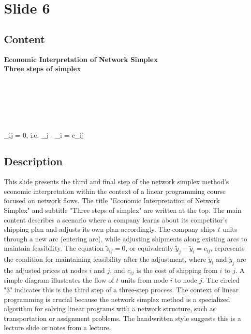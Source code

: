 \documentclass{article}%
\begin{document}
%
\newpage%
\section{Slide 6}%
\label{sec:Slide6}%
\subsection{Content}%

\textbf{Economic Interpretation of Network Simplex} \\
\underline{\textbf{Three steps of simplex}} \\
 \\
 \\
 \\
 \\
 \\
 \\
_{ij} = 0, \quad i.e. \quad {}_j - _i = c_{ij} \\
%
\subsection{Description}%
This slide presents the third and final step of the network simplex method's economic interpretation within the context of a linear programming course focused on network flows. The title "Economic Interpretation of Network Simplex" and subtitle "Three steps of simplex" are written at the top. The main content describes a scenario where a company learns about its competitor's shipping plan and adjusts its own plan accordingly. The company ships $t$ units through a new arc (entering arc), while adjusting shipments along existing arcs to maintain feasibility. The equation $\tilde{z}_{ij} = 0$, or equivalently $\tilde{y}_j - \tilde{y}_i = c_{ij}$, represents the condition for maintaining feasibility after the adjustment, where $\tilde{y}_i$ and $\tilde{y}_j$ are the adjusted prices at nodes $i$ and $j$, and $c_{ij}$ is the cost of shipping from $i$ to $j$.  A simple diagram illustrates the flow of $t$ units from node $i$ to node $j$. The circled "3" indicates this is the third step of a three-step process. The context of linear programming is crucial because the network simplex method is a specialized algorithm for solving linear programs with a network structure, such as transportation or assignment problems. The handwritten style suggests this is a lecture slide or notes from a lecture.%
\end{document}

